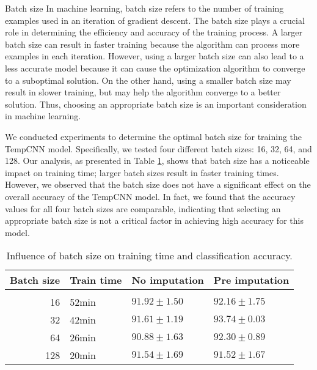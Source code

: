 \begin{paragraph}{Batch size}
In machine learning, batch size refers to the number of training examples used in an iteration of gradient descent.
The batch size plays a crucial role in determining the efficiency and accuracy of the training process.
A larger batch size can result in faster training because the algorithm can process more examples in each iteration.
However, using a larger batch size can also lead to a less accurate model because it can cause the optimization algorithm to converge to a suboptimal solution.
On the other hand, using a smaller batch size may result in slower training, but may help the algorithm converge to a better solution. 
Thus, choosing an appropriate batch size is an important consideration in machine learning.
\end{paragraph}

We conducted experiments to determine the optimal batch size for training the TempCNN model.
Specifically, we tested four different batch sizes: 16, 32, 64, and 128.
Our analysis, as presented in Table \ref{tab:temCNNbatchsize}, shows that batch size has a noticeable impact on training time; larger batch sizes result in faster training times.
However, we observed that the batch size does not have a significant effect on the overall accuracy of the TempCNN model.
In fact, we found that the accuracy values for all four batch sizes are comparable, indicating that selecting an appropriate batch size is not a critical factor in achieving high accuracy for this model.

\begin{table}[!htbp]
  \centering
   \begin{tabular}{rlll}
   Batch size                 & Train time  & No imputation         & Pre imputation             \\[0.2cm]
   \hline \\[-0.2cm]
    16        & 52min  	 & $91.92 \pm 1.50$ 	 & $92.16 \pm 1.75$\\
    32        & 42min  	 & $\mathbf{91.61 \pm 1.19}$ 	 & $\mathbf{93.74 \pm 0.03}$\\
    64        & 26min  	 & $90.88 \pm 1.63$ 	 & $92.30 \pm 0.89$\\
    128       & 20min  	 & $91.54 \pm 1.69$ 	 & $91.52 \pm 1.67$\\
   \end{tabular}
   \caption{Influence of batch size on training time and classification accuracy.}
   \label{tab:temCNNbatchsize}
 \end{table}
 
